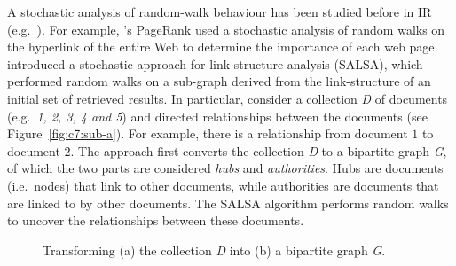 \documentclass[1p]{elsarticle}
\begin{document}

A stochastic analysis of random-walk behaviour has been studied before in IR (e.g.~\cite{brin1998,lempel2001tois,blanco2012ir}). For example, \cite{brin1998}'s PageRank used a stochastic analysis of random walks on the hyperlink of the entire Web to determine the importance of each web page. \cite{lempel2001tois} introduced a stochastic approach for link-structure analysis (SALSA), which performed random walks on a sub-graph derived from the link-structure of an initial set of retrieved results. 
In particular, consider a collection \emph{D} of documents (e.g.\ \emph{1, 2, 3, 4 and 5}) and directed relationships between the documents (see Figure~\ref{fig:c7:sub-a}). For example, there is a relationship from document $1$ to document $2$. The approach first converts the collection \emph{D} to a bipartite graph \emph{G}, of which the two parts are considered \emph{hubs} and \emph{authorities}. Hubs are documents (i.e.\ nodes) that link to other documents, while authorities are documents that are linked to by other documents. The SALSA algorithm performs random walks to uncover the relationships between these documents. 

\begin{figure*}[tb]
\centering
    \caption{%
        Transforming (a) the collection \emph{D} into (b) a bipartite graph \emph{G}.
     }%
   \label{fig:example}
\end{figure*}
\end{document}
